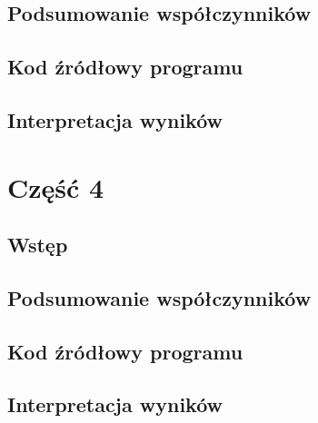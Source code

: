 \documentclass[
	12pt, %
]{fphw}
\begin{document}
\subsection{Podsumowanie współczynników}
\subsection{Kod źródłowy programu}
\subsection{Interpretacja wyników}
\section{Część 4}
\subsection{Wstęp}
\subsection{Podsumowanie współczynników}
\subsection{Kod źródłowy programu}
\subsection{Interpretacja wyników}
\end{document}

